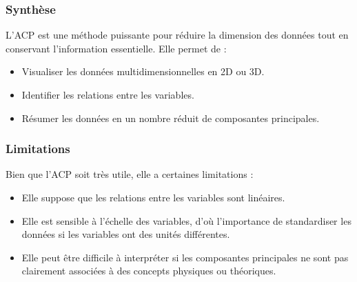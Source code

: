 \documentclass[10pt,a4paper]{article}
\begin{document}
\subsubsection*{Synthèse}
L'ACP est une méthode puissante pour réduire la dimension des données tout en conservant l'information essentielle. Elle permet de :
\begin{itemize}
    \item Visualiser les données multidimensionnelles en 2D ou 3D.
    \item Identifier les relations entre les variables.
    \item Résumer les données en un nombre réduit de composantes principales.
\end{itemize}

\subsubsection*{Limitations}
Bien que l'ACP soit très utile, elle a certaines limitations :
\begin{itemize}
    \item Elle suppose que les relations entre les variables sont linéaires.
    \item Elle est sensible à l'échelle des variables, d'où l'importance de standardiser les données si les variables ont des unités différentes.
    \item Elle peut être difficile à interpréter si les composantes principales ne sont pas clairement associées à des concepts physiques ou théoriques.
\end{itemize}
\end{document}
